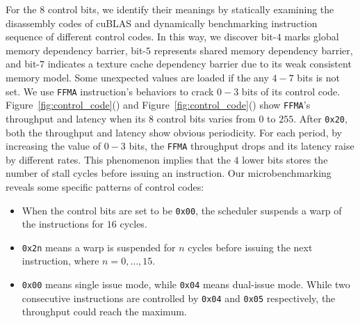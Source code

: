 For the $8$ control bits, we identify their meanings by statically examining the disassembly codes of cuBLAS and 
dynamically benchmarking instruction sequence of different control codes.
In this way, we discover bit-$4$ marks global memory dependency barrier, bit-$5$ represents shared memory dependency barrier, and bit-$7$ indicates a texture cache dependency barrier due to its weak consistent memory model. 
Some unexpected values are loaded if the any $4-7$ bits is not set. 
We use {\tt FFMA} instruction's behaviors to crack $0-3$ bits of its control code.
Figure~\ref{fig:control_code}() and 
Figure~\ref{fig:control_code}() show {\tt FFMA}'s throughput and latency  when its $8$ control bits varies from $0$ to $255$. 
After {\tt 0x20}, both the throughput and latency show obvious periodicity.
For each period, by increasing the value of $0-3$ bits, the {\tt FFMA} throughput drops and its latency raise by different rates. 
This phenomenon implies that the $4$ lower bits stores the number of stall cycles before issuing 
an instruction. 
Our microbenchmarking reveals some specific patterns of control codes:

\begin{itemize}
\item When the control bits are set to be {\tt 0x00}, the scheduler suspends a warp of the instructions for $16$ cycles.
\item {\tt 0x2n} means a warp is suspended for $n$ cycles before issuing the next instruction, where $n=0, \dots, 15$.
\item {\tt 0x00} means single issue mode, while {\tt 0x04} means dual-issue mode. 
While two consecutive instructions are controlled by {\tt 0x04} and {\tt 0x05} respectively, the throughput could reach the maximum. 
\end{itemize}


